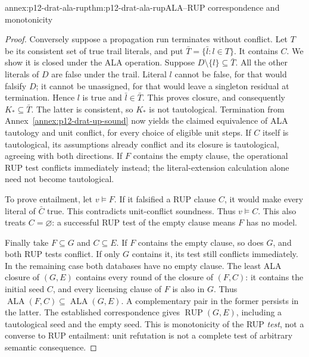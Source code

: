 \begin{annexitem}{annex:p12-drat-ala-rup}{thm:p12-drat-ala-rup}{ALA--RUP correspondence and monotonicity}
\begin{proof}
Conversely suppose a propagation run terminates without conflict.  Let \(T\)
be its consistent set of true trail literals, and put
\(\bar T=\{\bar l:l\in T\}\).  It contains \(C\).  We show it is
closed under the ALA operation.  Suppose
\(D\setminus\{l\}\subseteq\bar T\).  All the other literals of
\(D\) are false under the trail.  Literal \(l\) cannot be false, for that
would falsify \(D\); it cannot be unassigned, for that would leave a
singleton residual at termination.  Hence \(l\) is true and
\(\bar l\in\bar T\).  This proves closure, and consequently
\(K_*\subseteq\bar T\).  The latter is consistent, so \(K_*\) is
not tautological.  Termination from
Annex~\ref{annex:p12-drat-up-sound} now yields the claimed equivalence of
ALA tautology and unit conflict, for every choice of eligible unit steps.
If \(C\) itself is tautological, its assumptions already conflict and its
closure is tautological, agreeing with both directions.  If \(F\) contains
the empty clause, the operational RUP test conflicts immediately instead;
the literal-extension calculation alone need not become tautological.

To prove entailment, let \(v\models F\).  If it falsified a RUP clause
\(C\), it would make every literal of \(\bar C\) true.  This contradicts
unit-conflict soundness.  Thus \(v\models C\).  This also treats
\(C=\varnothing\): a successful RUP test of the empty clause means
\(F\) has no model.

Finally take \(F\subseteq G\) and \(C\subseteq E\).  If \(F\)
contains the empty clause, so does \(G\), and both RUP tests conflict.  If
only \(G\) contains it, its test still conflicts immediately.  In the
remaining case both databases have no empty clause.  The least ALA closure
of \((G,E)\) contains every round of the closure of \((F,C)\): it contains
the initial seed \(C\), and every licensing clause of \(F\) is also in
\(G\).  Thus
\(\operatorname{ALA}(F,C)\subseteq\operatorname{ALA}(G,E)\).
A complementary pair in the former persists in the latter.  The established
correspondence gives \(\operatorname{RUP}(G,E)\), including a
tautological seed and the empty seed.  This is monotonicity of the RUP
\emph{test}, not a converse to RUP entailment: unit refutation is not a
complete test of arbitrary semantic consequence.
\end{proof}
\end{annexitem}

